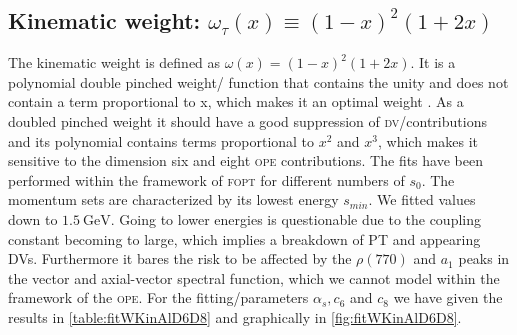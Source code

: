 \documentclass[../../index.tex]{subfiles}
\begin{document}
\subsection{Kinematic weight: $\omega_{\tau}(x) \equiv (1-x)^2(1+2x)$}
The kinematic weight is defined as $\omega(x) = (1-x)^2(1+2x)$. It is a
polynomial double pinched weight\-/ function that contains the unity and
does not contain a term proportional to x, which makes it an optimal weight
\cite{Beneke2012}. As a doubled pinched weight it should have a good suppression
of \textsc{dv}\-/contributions and its polynomial contains terms proportional to
$x^2$ and $x^3$, which makes it sensitive to the dimension six and eight \textsc{ope}
contributions. The fits have been performed within the framework of \textsc{fopt} for different numbers of $s_0$.
The momentum sets are characterized by its lowest energy $s_{min}$. We
fitted values down to $\SI{1.5}{\giga\eV}$. Going to lower energies is
questionable due to the coupling constant becoming to large, which implies a
breakdown of \textsc{PT} and appearing DVs. Furthermore it bares the
risk to be affected by the $\rho(770)$ and $a_1$ peaks in the vector and
axial-vector spectral function, which we cannot model within the framework of
the \textsc{ope}. For the fitting\-/parameters $\alpha_s, c_6$ and $c_8$ we have given the results in
\cref{table:fitWKinAlD6D8} and graphically in \cref{fig:fitWKinAlD6D8}.
\end{document}
